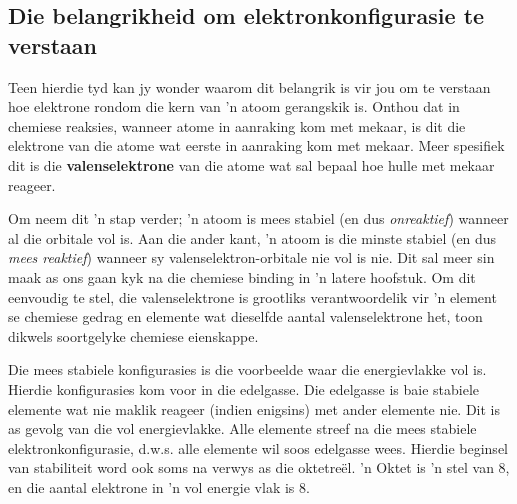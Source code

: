 \subsection*{Die belangrikheid om elektronkonfigurasie te verstaan}
\nopagebreak
\label{m38741*id260011}
Teen hierdie tyd kan jy wonder waarom dit belangrik is vir jou om te verstaan hoe elektrone rondom die kern van 'n atoom gerangskik is. Onthou dat in chemiese reaksies, wanneer atome in aanraking kom met mekaar, is dit die elektrone van die atome wat eerste in aanraking kom met mekaar. Meer spesifiek dit is die \textbf{valenselektrone} van die atome wat sal bepaal hoe hulle met mekaar reageer.\par 
        
Om neem dit 'n stap verder; 'n atoom is mees stabiel (en dus \textsl{onreaktief}) wanneer al die orbitale vol is. Aan die ander kant, 'n atoom is die minste stabiel (en dus \textsl{mees reaktief}) wanneer sy valenselektron-orbitale nie vol is nie. Dit sal meer sin maak as ons gaan kyk na die chemiese binding in 'n latere hoofstuk. Om dit eenvoudig te stel, die valenselektrone is grootliks verantwoordelik vir 'n element se chemiese gedrag en elemente wat dieselfde aantal valenselektrone het, toon dikwels soortgelyke chemiese eienskappe.\par 

Die mees stabiele konfigurasies is die voorbeelde waar die energievlakke vol is. Hierdie konfigurasies kom voor in die edelgasse. Die edelgasse is baie stabiele elemente wat nie maklik reageer (indien enigsins) met ander elemente nie. Dit is as gevolg van die vol energievlakke. Alle elemente streef na die mees stabiele elektronkonfigurasie, d.w.s. alle elemente wil soos edelgasse wees. Hierdie beginsel van stabiliteit word ook soms na verwys as die oktetreël. 'n Oktet is 'n stel van 8, en die aantal elektrone in 'n vol energie vlak is 8. \par 


